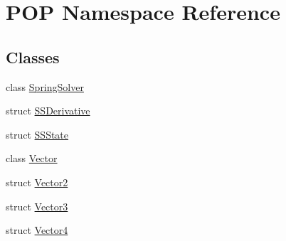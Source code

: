 \hypertarget{namespace_p_o_p}{}\section{P\+OP Namespace Reference}
\label{namespace_p_o_p}
\subsection*{Classes}
\begin{DoxyCompactItemize}
\item 
class \mbox{\hyperlink{class_p_o_p_1_1_spring_solver}{Spring\+Solver}}
\item 
struct \mbox{\hyperlink{struct_p_o_p_1_1_s_s_derivative}{S\+S\+Derivative}}
\item 
struct \mbox{\hyperlink{struct_p_o_p_1_1_s_s_state}{S\+S\+State}}
\item 
class \mbox{\hyperlink{class_p_o_p_1_1_vector}{Vector}}
\item 
struct \mbox{\hyperlink{struct_p_o_p_1_1_vector2}{Vector2}}
\item 
struct \mbox{\hyperlink{struct_p_o_p_1_1_vector3}{Vector3}}
\item 
struct \mbox{\hyperlink{struct_p_o_p_1_1_vector4}{Vector4}}
\end{DoxyCompactItemize}
